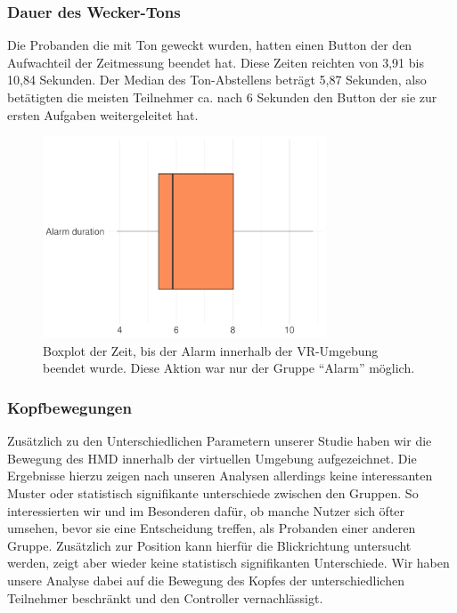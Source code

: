 \subsubsection{Dauer des Wecker-Tons}

Die Probanden die mit Ton geweckt wurden, hatten einen Button der den Aufwachteil der Zeitmessung beendet hat. Diese Zeiten reichten von 3,91 bis 10,84 Sekunden. Der Median des Ton-Abstellens beträgt 5,87 Sekunden, also betätigten die meisten Teilnehmer ca. nach 6 Sekunden den Button der sie zur ersten Aufgaben weitergeleitet hat. 

\begin{figure}[H]
	\centering
	\includegraphics[width=0.75\textwidth]{./_StudyResults/alarmDurationHist}
	\caption{Boxplot der Zeit, bis der Alarm innerhalb der VR-Umgebung beendet wurde. Diese Aktion war nur der Gruppe "`Alarm"' möglich.}
	\label{fig:alarmDurationHist}
\end{figure}

\subsubsection{Kopfbewegungen}

Zusätzlich zu den Unterschiedlichen Parametern unserer Studie haben wir die Bewegung des HMD innerhalb der virtuellen Umgebung aufgezeichnet. 
Die Ergebnisse hierzu zeigen nach unseren Analysen allerdings keine interessanten Muster oder statistisch signifikante unterschiede zwischen den Gruppen. 
So interessierten wir und im Besonderen dafür, ob manche Nutzer sich öfter umsehen, bevor sie eine Entscheidung treffen, als Probanden einer anderen Gruppe. 
Zusätzlich zur Position kann hierfür die Blickrichtung untersucht werden, zeigt aber wieder keine statistisch signifikanten Unterschiede.
Wir haben unsere Analyse dabei auf die Bewegung des Kopfes der unterschiedlichen Teilnehmer beschränkt und den Controller vernachlässigt.

